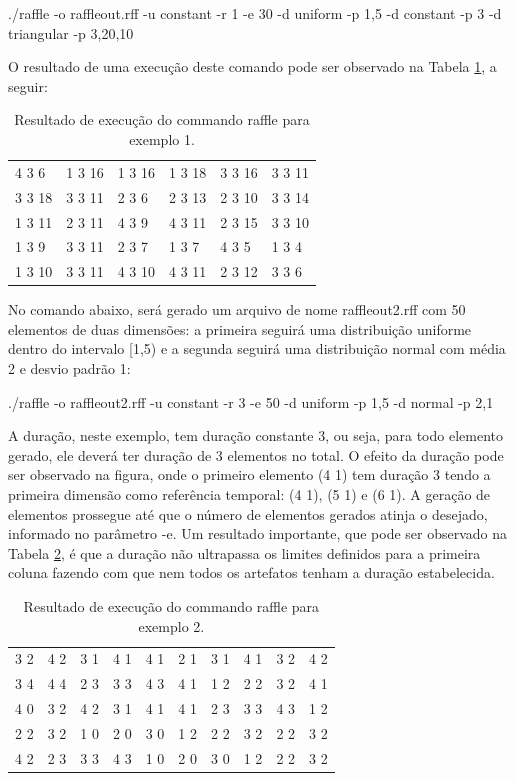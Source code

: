 ./raffle -o raffleout.rff -u constant -r 1 -e 30 -d uniform -p 1,5 -d constant -p 3 -d triangular -p 3,20,10

O resultado de uma execução deste comando pode ser observado na Tabela \ref{tab:raffleresult1}, a seguir:

\begin{table}[!h]
	\centering
	\caption{Resultado de execução do commando raffle para exemplo 1.}
	\label{tab:raffleresult1}
	\begin{tabular}{|l|l|l|l|l|l|}
		\hline
		4 3 6 & 1 3 16 & 1 3 16 & 1 3 18 & 3 3 16 & 3 3 11 \\
		3 3 18 & 3 3 11 & 2 3 6 & 2 3 13 & 2 3 10 & 3 3 14 \\
		1 3 11 & 2 3 11 & 4 3 9 & 4 3 11 & 2 3 15 & 3 3 10 \\
		1 3 9 & 3 3 11 & 2 3 7 & 1 3 7 & 4 3 5 & 1 3 4 \\
		1 3 10 & 3 3 11 & 4 3 10 & 4 3 11 & 2 3 12 & 3 3 6 \\
		\hline
	\end{tabular}
\end{table}

No comando abaixo, será gerado um arquivo de nome raffleout2.rff com 50 elementos de duas dimensões: a primeira seguirá uma distribuição uniforme dentro do intervalo [1,5) e a segunda seguirá uma distribuição normal com média 2 e desvio padrão 1:

./raffle -o raffleout2.rff -u constant -r 3 -e 50 -d uniform -p 1,5 -d normal -p 2,1

A duração, neste exemplo, tem duração constante 3, ou seja, para todo elemento gerado, ele deverá ter duração de 3 elementos no total. O efeito da duração pode ser observado na figura, onde o primeiro elemento (4 1) tem duração 3 tendo a primeira dimensão como referência temporal: (4 1), (5 1) e (6 1). A geração de elementos prossegue até que o número de elementos gerados atinja o desejado, informado no parâmetro -e. Um resultado importante, que pode ser observado na Tabela \ref{tab:raffleresult2}, é que a duração não ultrapassa os limites definidos para a primeira coluna fazendo com que nem todos os artefatos tenham a duração estabelecida.

\begin{table}[!h]
	\centering
	\caption{Resultado de execução do commando raffle para exemplo 2.}
	\label{tab:raffleresult2}
	\begin{tabular}{|l|l|l|l|l|l|l|l|l|l|}
		\hline
		3 2 & 4 2 & 3 1 & 4 1 & 4 1 & 2 1 & 3 1 & 4 1 & 3 2 & 4 2 \\
		3 4 & 4 4 & 2 3 & 3 3 & 4 3 & 4 1 & 1 2 & 2 2 & 3 2 & 4 1 \\
		4 0 & 3 2 & 4 2 & 3 1 & 4 1 & 4 1 & 2 3 & 3 3 & 4 3 & 1 2 \\
		2 2 & 3 2 & 1 0 & 2 0 & 3 0 & 1 2 & 2 2 & 3 2 & 2 2 & 3 2 \\
		4 2 & 2 3 & 3 3 & 4 3 & 1 0 & 2 0 & 3 0 & 1 2 & 2 2 & 3 2 \\
		\hline
	\end{tabular}
\end{table}

